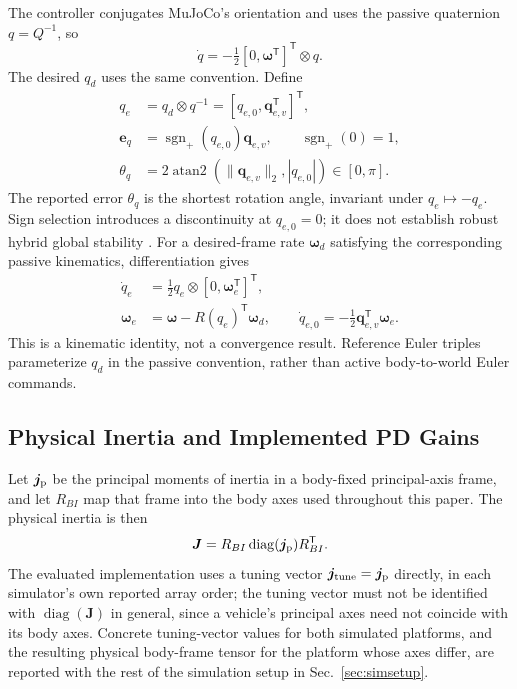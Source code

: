 \documentclass[letterpaper, 10 pt, conference]{ieeeconf}
\newcommand{\T}{^{\mathsf T}}
\newcommand{\sgnp}{\operatorname{sgn}_{+}}
\begin{document}
The controller conjugates MuJoCo's orientation and uses the passive
quaternion $q=Q^{-1}$, so
\begin{equation}
 \dot q=-\tfrac12[0,\bm\omega\T]\T\otimes q.
 \label{eq:passive}
\end{equation}
The desired $q_d$ uses the same convention. Define
\begin{align}
 q_e&=q_d\otimes q^{-1}=[q_{e,0},\bm q_{e,v}\T]\T,\\
 \bm e_q&=\sgnp(q_{e,0})\bm q_{e,v},\qquad \sgnp(0)=1,\\
 \theta_q&=2\operatorname{atan2}(\|\bm q_{e,v}\|_2,|q_{e,0}|)
             \in[0,\pi].
 \label{eq:theta}
\end{align}
The reported error $\theta_q$ is the shortest rotation angle, invariant
under $q_e\mapsto-q_e$. Sign selection introduces a discontinuity at
$q_{e,0}=0$; it does not establish robust hybrid global stability
\cite{mayhew2011hybrid}.
For a desired-frame rate $\bm\omega_d$ satisfying the corresponding
passive kinematics, differentiation gives
\begin{align}
 \dot q_e&=\tfrac12q_e\otimes[0,\bm\omega_e\T]\T,\\
 \bm\omega_e&=\bm\omega-R(q_e)\T\bm\omega_d,\qquad
 \dot q_{e,0}=-\tfrac12\bm q_{e,v}\T\bm\omega_e.
 \label{eq:errkin}
\end{align}
This is a kinematic identity, not a convergence result. Reference Euler
triples parameterize $q_d$ in the passive convention, rather than active
body-to-world Euler commands.

\subsection{Physical Inertia and Implemented PD Gains}
Let $\bm j_{\rm p}$ be the principal moments of inertia in a body-fixed
principal-axis frame, and let $R_{BI}$ map that frame into the body axes used
throughout this paper. The physical inertia is then
\begin{equation}
 \bm J=R_{BI}\operatorname{diag}(\bm j_{\rm p})R_{BI}\T.
 \label{eq:inertiaframe}
\end{equation}
The evaluated implementation uses a tuning vector $\bm j_{\rm tune}=\bm
j_{\rm p}$ directly, in each simulator's own reported array order; the
tuning vector must not be identified with $\operatorname{diag}(\bm J)$ in
general, since a vehicle's principal axes need not coincide with its body
axes. Concrete tuning-vector values for both simulated platforms, and the
resulting physical body-frame tensor for the platform whose axes differ, are
reported with the rest of the simulation setup in
Sec.~\ref{sec:simsetup}.
\end{document}
